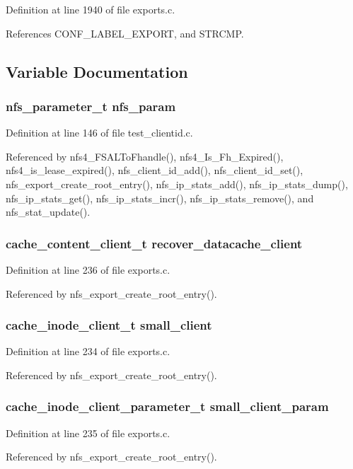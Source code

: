 Definition at line 1940 of file exports.c.

References CONF\_\-LABEL\_\-EXPORT, and STRCMP.

\subsection{Variable Documentation}
\subsubsection{\setlength{\rightskip}{0pt plus 5cm}nfs\_\-parameter\_\-t {\bf nfs\_\-param}}\label{exports_8c_a60}




Definition at line 146 of file test\_\-clientid.c.

Referenced by nfs4\_\-FSALTo\-Fhandle(), nfs4\_\-Is\_\-Fh\_\-Expired(), nfs4\_\-is\_\-lease\_\-expired(), nfs\_\-client\_\-id\_\-add(), nfs\_\-client\_\-id\_\-set(), nfs\_\-export\_\-create\_\-root\_\-entry(), nfs\_\-ip\_\-stats\_\-add(), nfs\_\-ip\_\-stats\_\-dump(), nfs\_\-ip\_\-stats\_\-get(), nfs\_\-ip\_\-stats\_\-incr(), nfs\_\-ip\_\-stats\_\-remove(), and nfs\_\-stat\_\-update().
\subsubsection{\setlength{\rightskip}{0pt plus 5cm}cache\_\-content\_\-client\_\-t {\bf recover\_\-datacache\_\-client}}\label{exports_8c_a63}




Definition at line 236 of file exports.c.

Referenced by nfs\_\-export\_\-create\_\-root\_\-entry().
\subsubsection{\setlength{\rightskip}{0pt plus 5cm}cache\_\-inode\_\-client\_\-t {\bf small\_\-client}}\label{exports_8c_a61}




Definition at line 234 of file exports.c.

Referenced by nfs\_\-export\_\-create\_\-root\_\-entry().
\subsubsection{\setlength{\rightskip}{0pt plus 5cm}cache\_\-inode\_\-client\_\-parameter\_\-t {\bf small\_\-client\_\-param}}\label{exports_8c_a62}




Definition at line 235 of file exports.c.

Referenced by nfs\_\-export\_\-create\_\-root\_\-entry().